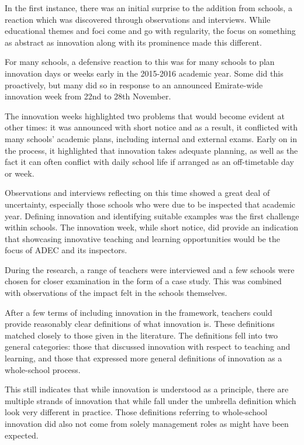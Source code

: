 \documentclass[11pt]{article}
\begin{document}
In the first instance, there was an initial surprise to the addition from schools, a reaction which was discovered through observations and interviews. While educational themes and foci come and go with regularity, the focus on something as abstract as innovation along with its prominence made this different.

For many schools, a defensive reaction to this was for many schools to plan innovation days or weeks early in the 2015-2016 academic year. Some did this proactively, but many did so in response to an announced Emirate-wide innovation week from 22nd to 28th November. 

The innovation weeks highlighted two problems that would become evident at other times: it was announced with short notice and as a result, it conflicted with many schools' academic plans, including internal and external exams.
Early on in the process, it highlighted that innovation takes adequate planning, as well as the fact it can often conflict with daily school life if arranged as an off-timetable day or week.

Observations and interviews reflecting on this time showed a great deal of uncertainty, especially those schools who were due to be inspected that academic year. Defining innovation and identifying suitable examples was the first challenge within schools. The innovation week, while short notice, did provide an indication that showcasing innovative teaching and learning opportunities would be the focus of ADEC and its inspectors.

During the research, a range of teachers were interviewed and a few schools were chosen for closer examination in the form of a case study. This was combined with observations of the impact felt in the schools themselves.

After a few terms of including innovation in the framework, teachers could provide reasonably clear definitions of what innovation is. These definitions matched closely to those given in the literature. The definitions fell into two general categories: those that discussed innovation with respect to teaching and learning, and those that expressed more general definitions of innovation as a whole-school process.

This still indicates that while innovation is understood as a principle, there are multiple strands of innovation that while fall under the umbrella definition which look very different in practice. Those definitions referring to whole-school innovation did also not come from solely management roles as might have been expected.
\end{document}

